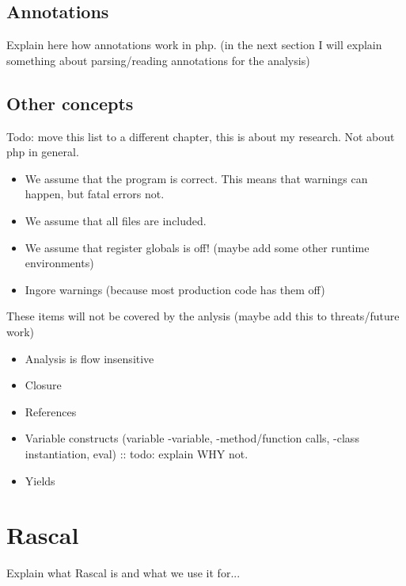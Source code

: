 \documentclass[../main.tex]{subfiles}
\begin{document}
    \subsection{Annotations}
    Explain here how annotations work in php. (in the next section I will explain something about parsing/reading annotations for the analysis)
    
    \subsection{Other concepts}
    Todo: move this list to a different chapter, this is about my research. Not about php in general.
    \begin{itemize}
        \item We assume that the program is correct. This means that warnings can happen, but fatal errors not.
        \item We assume that all files are included.
        \item We assume that register globals is off! (maybe add some other runtime environments)
        \item Ingore warnings (because most production code has them off)
    \end{itemize}
    These items will not be covered by the anlysis (maybe add this to threats/future work)
    \begin{itemize}
        \item Analysis is flow insensitive
        \item Closure
        \item References
        \item Variable constructs (variable -variable, -method/function calls, -class instantiation, eval) :: todo: explain WHY not.
        \item Yields
        
    \end{itemize}


    
    \section{Rascal}
    Explain what \Gls{Rascal} is and what we use it for...
\end{document}
